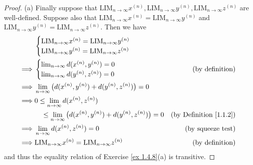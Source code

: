 \begin{proof}{(a)}
    Finally suppose that \(\text{LIM}_{n \to \infty} x^{(n)}, \text{LIM}_{n \to \infty} y^{(n)}, \text{LIM}_{n \to \infty} z^{(n)}\) are well-defined.
    Suppose also that \(\text{LIM}_{n \to \infty} x^{(n)} = \text{LIM}_{n \to \infty} y^{(n)}\) and \(\text{LIM}_{n \to \infty} y^{(n)} = \text{LIM}_{n \to \infty} z^{(n)}\).
    Then we have
    \begin{align*}
                 & \begin{cases}
            \text{LIM}_{n \to \infty} x^{(n)} = \text{LIM}_{n \to \infty} y^{(n)} \\
            \text{LIM}_{n \to \infty} y^{(n)} = \text{LIM}_{n \to \infty} z^{(n)}
        \end{cases}                                                                                                  \\
        \implies & \begin{cases}
            \lim_{n \to \infty} d(x^{(n)}, y^{(n)}) = 0 \\
            \lim_{n \to \infty} d(y^{(n)}, z^{(n)}) = 0
        \end{cases}                                                             & \text{(by definition)}             \\
        \implies & \lim_{n \to \infty} \big(d(x^{(n)}, y^{(n)}) + d(y^{(n)}, z^{(n)})\big) = 0                                                 \\
        \implies & 0 \leq \lim_{n \to \infty} d(x^{(n)}, z^{(n)})                                                                              \\
                 & \quad \leq \lim_{n \to \infty} \big(d(x^{(n)}, y^{(n)}) + d(y^{(n)}, z^{(n)})\big) = 0 & \text{(by Definition \ref{1.1.2})} \\
        \implies & \lim_{n \to \infty} d(x^{(n)}, z^{(n)}) = 0                                            & \text{(by squeeze test)}           \\
        \implies & \text{LIM}_{n \to \infty} x^{(n)} = \text{LIM}_{n \to \infty} z^{(n)}                  & \text{(by definition)}
    \end{align*}
    and thus the equality relation of Exercise \ref{ex 1.4.8}(a) is transitive.
\end{proof}

